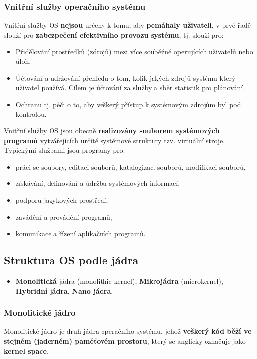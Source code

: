 \subsubsection{Vnitřní služby operačního systému}
Vnitřní služby OS \textbf{nejsou} určeny k tomu, aby \textbf{pomáhaly uživateli}, v prvé řadě slouží pro \textbf{zabezpečení efektivního provozu systému}, tj. slouží pro:
\begin{itemize}
	\item Přidělování prostředků (zdrojů) mezi více souběžně operujících uživatelů nebo úloh.
	\item Účtování a udržování přehledu o tom, kolik jakých zdrojů systému který uživatel používá. Cílem je účtování za služby a sběr statistik pro plánování.
	\item Ochranu tj. péči o to, aby veškerý přístup k systémovým zdrojům byl pod kontrolou.
\end{itemize}
Vnitřní služby OS jsou obecně \textbf{realizovány souborem systémových programů} vytvářejících určité systémové struktury tzv. virtuální stroje. Typickými službami jsou programy pro:
\begin{itemize}
	\item práci se soubory, editaci souborů, katalogizaci souborů, modifikaci souborů,
	\item získávání, definování a údržbu systémových informací,
	\item podporu jazykových prostředí,
	\item zavádění a provádění programů,
	\item komunikace a řízení aplikačních programů.
\end{itemize}

\subsection{Struktura OS podle jádra}
\begin{itemize}
	\item \textbf{Monolitická} jádra (monolithic kernel), \textbf{Mikrojádra} (microkernel), \textbf{Hybridní jádra}, \textbf{Nano jádra}.
\end{itemize}
\subsubsection{Monolitické jádro}
Monolitické jádro je druh jádra operačního systému, jehož \textbf{veškerý kód běží ve stejném (jaderném) paměťovém prostoru}, který se anglicky označuje jako \textbf{kernel space}. 

